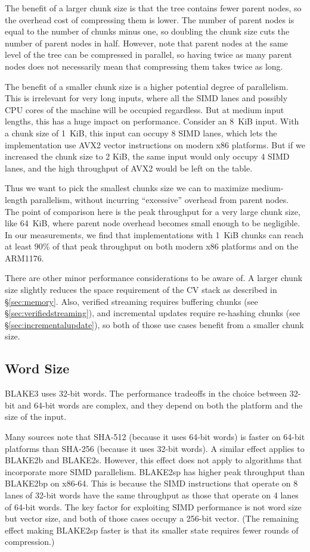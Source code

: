 \documentclass[11pt,notitlepage,a4paper]{article}
\begin{document}
The benefit of a larger chunk size is that the tree contains fewer parent
nodes, so the overhead cost of compressing them is lower. The number of parent
nodes is equal to the number of chunks minus one, so doubling the chunk size
cuts the number of parent nodes in half. However, note that parent nodes at the
same level of the tree can be compressed in parallel, so having twice as many
parent nodes does not necessarily mean that compressing them takes twice as
long.

The benefit of a smaller chunk size is a higher potential degree of
parallelism. This is irrelevant for very long inputs, where all the SIMD lanes
and possibly CPU cores of the machine will be occupied regardless. But at
medium input lengths, this has a huge impact on performance. Consider an 8~KiB
input. With a chunk size of 1~KiB, this input can occupy 8 SIMD lanes, which
lets the implementation use AVX2 vector instructions on modern x86 platforms.
But if we increased the chunk size to 2 KiB, the same input would only occupy 4
SIMD lanes, and the high throughput of AVX2 would be left on the table.

Thus we want to pick the smallest chunks size we can to maximize medium-length
parallelism, without incurring ``excessive'' overhead from parent nodes. The
point of comparison here is the peak throughput for a very large chunk size,
like 64~KiB, where parent node overhead becomes small enough to be negligible.
In our measurements, we find that implementations with 1~KiB chunks can reach
at least 90\% of that peak throughput on both modern x86 platforms and on the
ARM1176.

There are other minor performance considerations to be aware of. A larger chunk
size slightly reduces the space requirement of the CV stack as described in
\S\ref{sec:memory}. Also, verified streaming requires buffering chunks (see
\S\ref{sec:verifiedstreaming}), and incremental updates require re-hashing
chunks (see \S\ref{sec:incrementalupdate}), so both of those use cases benefit
from a smaller chunk size.

\subsection{Word Size}\label{sec:wordsize}

BLAKE3 uses 32-bit words. The performance tradeoffs in the choice between
32-bit and 64-bit words are complex, and they depend on both the platform and
the size of the input.

Many sources note that SHA-512 (because it uses 64-bit words) is faster on
64-bit platforms than SHA-256 (because it uses 32-bit words). A similar effect
applies to BLAKE2b and BLAKE2s. However, this effect does not apply to
algorithms that incorporate more SIMD parallelism. BLAKE2sp has higher peak
throughput than BLAKE2bp on x86-64. This is because the SIMD instructions that
operate on 8 lanes of 32-bit words have the same throughput as those that
operate on 4 lanes of 64-bit words. The key factor for exploiting SIMD
performance is not word size but vector size, and both of those cases occupy a
256-bit vector. (The remaining effect making BLAKE2sp faster is that its
smaller state requires fewer rounds of compression.)
\end{document}
